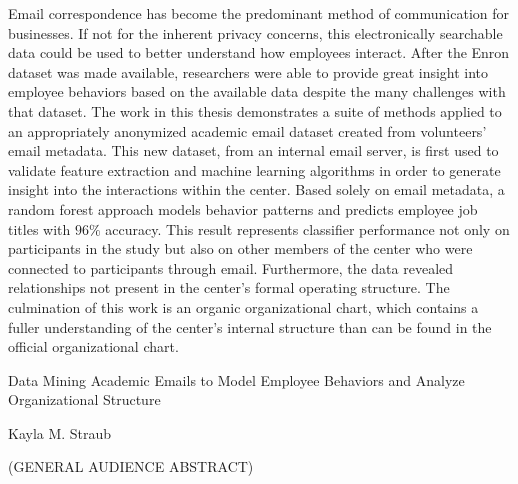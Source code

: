 \documentclass[12pt]{report}
\begin{document}
Email correspondence has become the predominant method of communication for businesses.
If not for the inherent privacy concerns, this electronically searchable data could be used to better understand how employees interact. 
After the Enron dataset was made available, researchers were able to provide great insight into employee behaviors based on the available data despite the many challenges with that dataset.  
The work in this thesis demonstrates a suite of methods applied to an appropriately anonymized academic email dataset created from volunteers' email metadata.  
This new dataset, from an internal email server, is first used to validate feature extraction and machine learning algorithms in order to generate insight into the interactions within the center.  
Based solely on email metadata, a random forest approach models behavior patterns and predicts employee job titles with $96\%$ accuracy.
This result represents classifier performance not only on participants in the study but also on other members of the center who were connected to participants through email.
Furthermore, the data revealed relationships not present in the center's formal operating structure.
The culmination of this work is an organic organizational chart, which contains a fuller understanding of the center's internal structure than can be found in the official organizational chart.


\vfill



\pagebreak

\thispagestyle{empty}
\begin{center}
	
	{\large Data Mining Academic Emails to Model Employee Behaviors and Analyze Organizational Structure}
	
	\vfill
	
	Kayla M. Straub
	
	\vfill
	
	(GENERAL AUDIENCE ABSTRACT)
	
	\vfill
	
\end{center}
\end{document}

